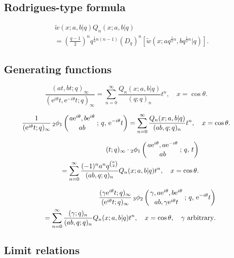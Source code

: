 \documentclass[envcountchap,graybox]{svmono}
\newcommand{\qhyp}[5]{\mbox{}_{#1}{\phi}_{#2}
\left(\genfrac{}{}{0pt}{}{#3}{#4}\,;\,q,\,#5\right)}
\newcommand{\e}{\textrm{e}}
\newcommand{\qhyp}[5]{\,\mbox{}_{#1}\phi_{#2}\!\left(
  \genfrac{}{}{0pt}{}{#3}{#4};#5\right)}
\begin{document}
\subsection*{Rodrigues-type formula}
\begin{eqnarray}
\label{RodAlSalamChihara}
& &{\tilde w}(x;a,b|q)Q_n(x;a,b|q)\nonumber\\
& &{}=\left(\frac{q-1}{2}\right)^nq^{\frac{1}{4}n(n-1)}
\left(D_q\right)^n\left[{\tilde w}(x;aq^{\frac{1}{2}n},bq^{\frac{1}{2}n}|q)\right].
\end{eqnarray}

\subsection*{Generating functions}
\begin{equation}
\label{GenAlSalamChihara1}
\frac{(at,bt;q)_{\infty}}{(\e^{i\theta}t,\e^{-i\theta}t;q)_{\infty}}
=\sum_{n=0}^{\infty}\frac{Q_n(x;a,b|q)}{(q;q)_n}t^n,\quad x=\cos\theta.
\end{equation}

\begin{equation}
\label{GenAlSalamChihara2}
\frac{1}{(\e^{i\theta}t;q)_{\infty}}\,
\qhyp{2}{1}{a\e^{i\theta},b\e^{i\theta}}{ab}{\e^{-i\theta}t}
=\sum_{n=0}^{\infty}\frac{Q_n(x;a,b|q)}{(ab,q;q)_n}t^n,\quad x=\cos\theta.
\end{equation}

\begin{eqnarray}
\label{GenAlSalamChihara3}
& &(t;q)_{\infty}\cdot\qhyp{2}{1}{a\e^{i\theta},a\e^{-i\theta}}{ab}{t}\nonumber\\
& &{}=\sum_{n=0}^{\infty}\frac{(-1)^na^nq^{\binom{n}{2}}}{(ab,q;q)_n}Q_n(x;a,b|q)t^n,
\quad x=\cos\theta.
\end{eqnarray}

\begin{eqnarray}
\label{GenAlSalamChihara4}
& &\frac{(\gamma \e^{i\theta}t;q)_{\infty}}{(\e^{i\theta}t;q)_{\infty}}\,
\qhyp{3}{2}{\gamma,a\e^{i\theta},b\e^{i\theta}}{ab,\gamma \e^{i\theta}t}{\e^{-i\theta}t}\nonumber\\
& &{}=\sum_{n=0}^{\infty}\frac{(\gamma;q)_n}{(ab,q;q)_n}Q_n(x;a,b|q)t^n,
\quad x=\cos\theta,\quad\textrm{$\gamma$ arbitrary}.
\end{eqnarray}

\subsection*{Limit relations}
\end{document}
